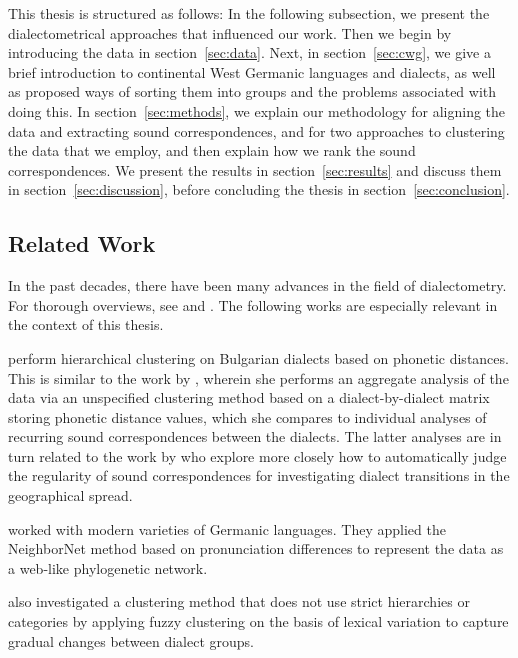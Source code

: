 \documentclass[a4paper]{article}
\begin{document}
This thesis is structured as follows:
In the following subsection, we present the
dialectometrical approaches that influenced our work.
Then we begin by introducing the data in section~\ref{sec:data}.
Next, in section~\ref{sec:cwg},
we give a brief introduction to continental West Germanic languages and dialects,
as well as proposed ways of sorting them into groups
and the problems associated with doing this.
In section~\ref{sec:methods}, we explain our methodology for
aligning the data and extracting sound correspondences,
and for two approaches to clustering the data that we employ,
and then explain how we rank the sound correspondences.
We present the results in section~\ref{sec:results}
and discuss them in section~\ref{sec:discussion},
before concluding the thesis in section~\ref{sec:conclusion}.

\subsection{Related Work}

In the past decades, there have been many advances in the field of dialectometry.
For thorough overviews, see \citet{nerbonne2009data} and \citet{wieling2015advances}.
The following works are especially relevant in the context of this thesis.

\citet{prokic2012detecting} perform hierarchical clustering
on Bulgarian dialects based on phonetic distances.
This is %
similar to the work by \citet{prokic2007identifying},
wherein she performs an aggregate analysis of the
data via an unspecified clustering method based on a
dialect-by-dialect matrix storing phonetic distance values,
which she compares to individual analyses of recurring sound correspondences
between the dialects.
The latter analyses are in turn related to the work by
\citet{prokic2013combining} who explore more closely how
to automatically judge the regularity of sound correspondences
for investigating dialect transitions in the geographical spread.

\citet{heggarty2010splits} worked with modern varieties of Germanic languages.
They applied the NeighborNet method \citep{bryant2004neighbornet}
based on pronunciation differences to represent the data as a
web-like phylogenetic network.

\citet{proell2013detecting} also investigated a clustering method
that does not use strict hierarchies or categories by
applying fuzzy clustering on the basis of lexical variation
to capture gradual changes between dialect groups.
\end{document}
